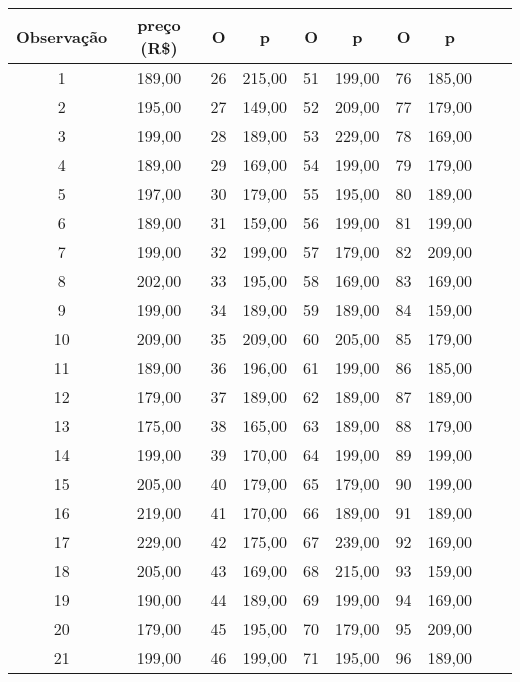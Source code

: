 \begin{table}
    \centering
    \begin{tabular}{cccccccccc}
    \toprule
    Observação & preço (R\$) & O  & p      & O  & p      & O   & p \\
    \midrule
    1          & 189,00      & 26 & 215,00 & 51 & 199,00 & 76  & 185,00 \\
    2          & 195,00      & 27 & 149,00 & 52 & 209,00 & 77  & 179,00 \\
    3          & 199,00      & 28 & 189,00 & 53 & 229,00 & 78  & 169,00 \\
    4          & 189,00      & 29 & 169,00 & 54 & 199,00 & 79  & 179,00 \\
    5          & 197,00      & 30 & 179,00 & 55 & 195,00 & 80  & 189,00 \\
    6          & 189,00      & 31 & 159,00 & 56 & 199,00 & 81  & 199,00 \\
    7          & 199,00      & 32 & 199,00 & 57 & 179,00 & 82  & 209,00 \\
    8          & 202,00      & 33 & 195,00 & 58 & 169,00 & 83  & 169,00 \\
    9          & 199,00      & 34 & 189,00 & 59 & 189,00 & 84  & 159,00 \\
    10         & 209,00      & 35 & 209,00 & 60 & 205,00 & 85  & 179,00 \\
    11         & 189,00      & 36 & 196,00 & 61 & 199,00 & 86  & 185,00 \\
    12         & 179,00      & 37 & 189,00 & 62 & 189,00 & 87  & 189,00 \\
    13         & 175,00      & 38 & 165,00 & 63 & 189,00 & 88  & 179,00 \\
    14         & 199,00      & 39 & 170,00 & 64 & 199,00 & 89  & 199,00 \\
    15         & 205,00      & 40 & 179,00 & 65 & 179,00 & 90  & 199,00 \\
    16         & 219,00      & 41 & 170,00 & 66 & 189,00 & 91  & 189,00 \\
    17         & 229,00      & 42 & 175,00 & 67 & 239,00 & 92  & 169,00 \\
    18         & 205,00      & 43 & 169,00 & 68 & 215,00 & 93  & 159,00 \\
    19         & 190,00      & 44 & 189,00 & 69 & 199,00 & 94  & 169,00 \\
    20         & 179,00      & 45 & 195,00 & 70 & 179,00 & 95  & 209,00 \\
    21         & 199,00      & 46 & 199,00 & 71 & 195,00 & 96  & 189,00 \\

\end{tabular}
\end{table}

